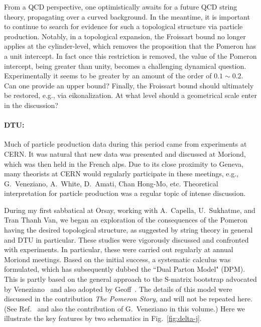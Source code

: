 \documentclass[11pt, oneside]{article}   	%
\newcommand{\<}{\langle}
\renewcommand{\>}{\rangle}
\numberwithin{equation}{section}
\numberwithin{figure}{section}
\begin{document}
From a QCD perspective, one optimistically  awaits for a future QCD string theory, propagating over a curved background. In the meantime, it is important to  continue to search for evidence for such a topological structure via particle production. Notably, in a topological expansion, the Froissart bound no  longer applies at the cylinder-level, which removes the proposition that   the Pomeron has a unit intercept. In fact once this restriction is removed, the value of the Pomeron intercept, being greater than unity, becomes a challenging dynamical question.  Experimentally it seems to be greater by an amount of the order of $0.1\sim 0.2$.  Can one provide an upper bound? Finally, the Froissart bound should ultimately be restored, e.g., via eikonalization. At what level should a geometrical scale enter in the discussion?


\vspace{-2mm}

\paragraph{DTU:}
Much of particle production data during this period came from experiments at CERN. It was natural that new data was presented and discussed at Moriond, which was then held in the French alps.  Due to its close proximity to Geneva, many theorists at CERN would regularly participate in these meetings, e.g., G.~Veneziano, A.~White, D.~Amati, Chan Hong-Mo, etc. Theoretical  interpretation for particle production was a regular topic of intense discussion.


During my first sabbatical at Orsay, working with A.~Capella, U.~Sukhatme, and Tran Thanh Van, we began an exploration of the consequences of the Pomeron having the desired topological structure, as suggested by string theory in general and DTU in particular. These studies were vigorously discussed and confronted with experiments. In particular, these were carried out regularly at annual Moriond meetings. Based on the initial success, a systematic calculus was formulated, which has subsequently dubbed the ``Dual Parton Model" (DPM)\cite{Capella:1992yb}. This is partly based on the general approach to the S-matrix bootstrap advocated by Veneziano~\cite{Veneziano:1971fp} and also adopted by Geoff~\cite{Chew:1977yk}. The details of this model were discussed in the contribution {\it The Pomeron Story}, and  will not be repeated here. (See Ref.~\cite{Capella:1992yb}  and also the contribution of \mbox{G.~Veneziano} in this volume.) Here we illustrate the key features by two schematics  in Fig.~\ref{fig:delta-j}.
\end{document}
